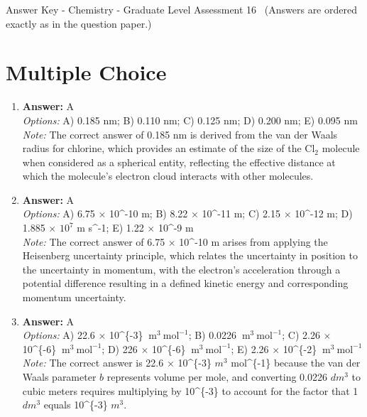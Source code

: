 \documentclass[12pt]{article}
\begin{document}
\begin{center}
Answer Key - Chemistry - Graduate Level Assessment 16 \
\small (Answers are ordered exactly as in the question paper.)
\end{center}

\section*{Multiple Choice}
\begin{enumerate}[label=\arabic*.]
\item \textbf{Answer:} A
\\ \textit{Options:} A) 0.185 $\mathrm{nm}$; B) 0.110 $\mathrm{nm}$; C) 0.125 $\mathrm{nm}$; D) 0.200 $\mathrm{nm}$; E) 0.095 $\mathrm{nm}$
\\ \textit{Note:} The correct answer of 0.185 nm is derived from the van der Waals radius for chlorine, which provides an estimate of the size of the $\mathrm{Cl}_2$ molecule when considered as a spherical entity, reflecting the effective distance at which the molecule's electron cloud interacts with other molecules.
\item \textbf{Answer:} A
\\ \textit{Options:} A) 6.75 \ensuremath{\times} 10^-10 m; B) 8.22 \ensuremath{\times} 10^-11 m; C) 2.15 \ensuremath{\times} 10^-12 m; D) 1.885 \ensuremath{\times} $10^7$ m s^-1; E) 1.22 \ensuremath{\times} 10^-9 m
\\ \textit{Note:} The correct answer of 6.75 × 10^-10 m arises from applying the Heisenberg uncertainty principle, which relates the uncertainty in position to the uncertainty in momentum, with the electron's acceleration through a potential difference resulting in a defined kinetic energy and corresponding momentum uncertainty.
\item \textbf{Answer:} A
\\ \textit{Options:} A) 22.6 \ensuremath{\times} 10^\{-3\} $\mathrm{~m}^3 \mathrm{~mol}^{-1}$; B) 0.0226 $\mathrm{~m}^3 \mathrm{~mol}^{-1}$; C) 2.26 \ensuremath{\times} 10^\{-6\} $\mathrm{~m}^3 \mathrm{~mol}^{-1}$; D) 226 \ensuremath{\times} 10^\{-6\} $\mathrm{~m}^3 \mathrm{~mol}^{-1}$; E) 2.26 \ensuremath{\times} 10^\{-2\} $\mathrm{~m}^3 \mathrm{~mol}^{-1}$
\\ \textit{Note:} The correct answer is 22.6 × 10^\{-3\} $m^3$ mol^\{-1\} because the van der Waals parameter $b$ represents volume per mole, and converting 0.0226 $dm^3$ to cubic meters requires multiplying by 10^\{-3\} to account for the factor that 1 $dm^3$ equals 10^\{-3\} $m^3$.

\end{enumerate}
\end{document}
